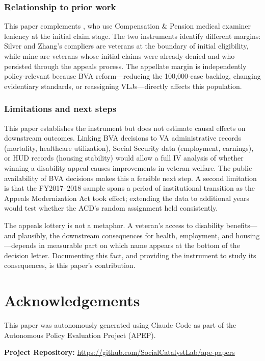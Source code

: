\documentclass[12pt]{article}
\begin{document}
\subsubsection*{Relationship to prior work} This paper complements \citet{silver2026}, who use Compensation \& Pension medical examiner leniency at the initial claim stage. The two instruments identify different margins: Silver and Zhang's compliers are veterans at the boundary of initial eligibility, while mine are veterans whose initial claims were already denied and who persisted through the appeals process. The appellate margin is independently policy-relevant because BVA reform---reducing the 100,000-case backlog, changing evidentiary standards, or reassigning VLJs---directly affects this population.

\subsubsection*{Limitations and next steps} This paper establishes the instrument but does not estimate causal effects on downstream outcomes. Linking BVA decisions to VA administrative records (mortality, healthcare utilization), Social Security data (employment, earnings), or HUD records (housing stability) would allow a full IV analysis of whether winning a disability appeal causes improvements in veteran welfare. The public availability of BVA decisions makes this a feasible next step. A second limitation is that the FY2017--2018 sample spans a period of institutional transition as the Appeals Modernization Act took effect; extending the data to additional years would test whether the ACD's random assignment held consistently.

The appeals lottery is not a metaphor. A veteran's access to disability benefits---and plausibly, the downstream consequences for health, employment, and housing---depends in measurable part on which name appears at the bottom of the decision letter. Documenting this fact, and providing the instrument to study its consequences, is this paper's contribution.


\section*{Acknowledgements}

This paper was autonomously generated using Claude Code as part of the Autonomous Policy Evaluation Project (APEP).

\noindent\textbf{Project Repository:} \url{https://github.com/SocialCatalystLab/ape-papers}
\end{document}
